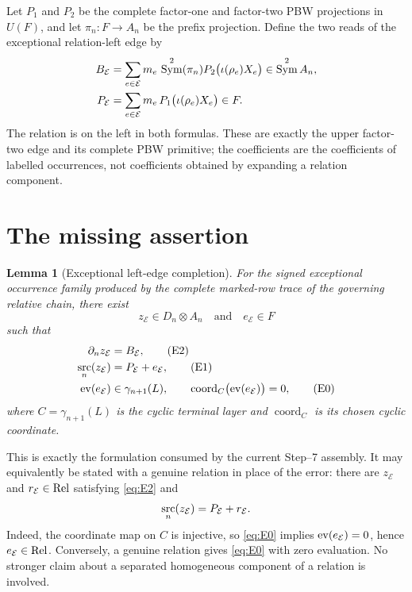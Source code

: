 \documentclass[11pt]{article}
\newtheorem{lemma}{Lemma}
\newcommand{\Rel}{\mathop{\rm Rel}}
\newcommand{\Sym}{\mathop{\rm Sym}}
\newcommand{\src}{\mathop{\rm src}}
\newcommand{\ev}{\mathop{\rm ev}}
\begin{document}
Let \(P_1\) and \(P_2\) be the complete factor-one and factor-two PBW
projections in \(U(F)\), and let \(\pi_n:F\to A_n\) be the prefix
projection.  Define the two reads of the exceptional relation-left edge by
\begin{align*}
 B_{\mathcal E}
   &=\sum_{e\in\mathcal E}m_e\,
       \Sym^2(\pi_n)P_2\bigl(\iota(\rho_e)X_e\bigr)
       \in\Sym^2A_n,\\
 P_{\mathcal E}
   &=\sum_{e\in\mathcal E}m_e\,
       P_1\bigl(\iota(\rho_e)X_e\bigr)
       \in F.
\end{align*}
The relation is on the left in both formulas.  These are exactly the upper
factor-two edge and its complete PBW primitive; the coefficients are the
coefficients of labelled occurrences, not coefficients obtained by expanding
a relation component.

\section{The missing assertion}

\begin{lemma}[Exceptional left-edge completion]\label{lem:missing}
For the signed exceptional occurrence family produced by the complete
marked-row trace of the governing relative chain, there exist
\[
       z_{\mathcal E}\in D_n\otimes A_n
       \quad\text{and}\quad e_{\mathcal E}\in F
\]
such that
\begin{align}
       \partial_n z_{\mathcal E}&=B_{\mathcal E},
                                                        \tag{E2}\label{eq:E2}\\
       \src_n(z_{\mathcal E})&=P_{\mathcal E}+e_{\mathcal E},
                                                        \tag{E1}\label{eq:E1}\\
       \ev(e_{\mathcal E})&\in\gamma_{n+1}(L),
       \qquad
       \operatorname{coord}_C\bigl(\ev(e_{\mathcal E})\bigr)=0,
                                                        \tag{E0}\label{eq:E0}
\end{align}
where $C=\gamma_{n+1}(L)$ is the cyclic terminal layer and
$\operatorname{coord}_C$ is its chosen cyclic coordinate.
\end{lemma}

This is exactly the formulation consumed by the current Step--7 assembly.
It may equivalently be stated with a genuine relation in place of the error:
there are $z_{\mathcal E}$ and $r_{\mathcal E}\in\Rel$ satisfying
\eqref{eq:E2} and
\[
       \src_n(z_{\mathcal E})=P_{\mathcal E}+r_{\mathcal E}.
\]
Indeed, the coordinate map on $C$ is injective, so \eqref{eq:E0} implies
$\ev(e_{\mathcal E})=0$, hence $e_{\mathcal E}\in\Rel$.  Conversely, a
genuine relation gives \eqref{eq:E0} with zero evaluation.  No stronger
claim about a separated homogeneous component of a relation is involved.
\end{document}
